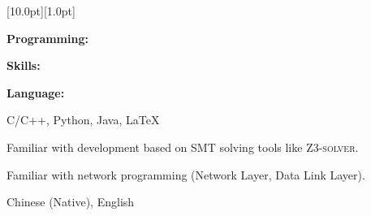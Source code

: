 \documentclass[12pt,a4paper,utf8]{report}
\begin{document}
\begin{minipage}[t]{16cm}
    \colorbox{subtitlecolor}{\raisebox{0pt}[10.0pt][1.0pt]{
        \textcolor{white}{\textsf{}}}}
\end{minipage}\par
\vspace{0.2cm}
    \begin{minipage}[t]{4cm}
        \qquad \textbf{Programming:}\par
        \qquad \textbf{Skills:}\par
        \qquad \par
        \qquad \textbf{Language:}\par
    \end{minipage}
    \begin{minipage}[t]{14cm}
        C/C++, Python, Java, \LaTeX \par
       	Familiar with development based on SMT solving tools like \textsc{Z3-solver}.\par
       	Familiar with network programming (Network Layer, Data Link Layer). \par
        Chinese (Native), English \par
    \end{minipage}\par
\vspace{0.4cm}
\end{document}
